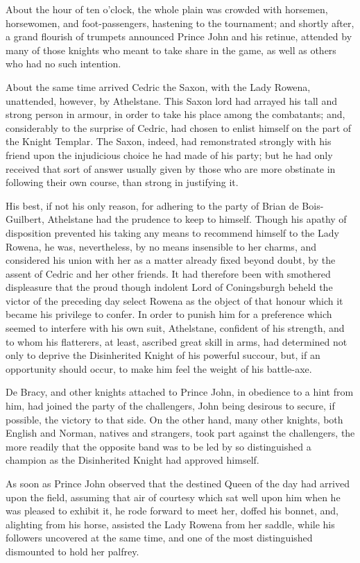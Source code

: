 About the hour of ten o'clock, the whole plain was crowded with
horsemen, horsewomen, and foot-passengers, hastening to the tournament;
and shortly after, a grand flourish of trumpets announced Prince John
and his retinue, attended by many of those knights who meant to take
share in the game, as well as others who had no such intention.

About the same time arrived Cedric the Saxon, with the Lady Rowena,
unattended, however, by Athelstane. This Saxon lord had arrayed his tall
and strong person in armour, in order to take his place among the
combatants; and, considerably to the surprise of Cedric, had chosen to
enlist himself on the part of the Knight Templar. The Saxon, indeed, had
remonstrated strongly with his friend upon the injudicious choice he had
made of his party; but he had only received that sort of answer usually
given by those who are more obstinate in following their own course,
than strong in justifying it.

His best, if not his only reason, for adhering to the party of Brian de
Bois-Guilbert, Athelstane had the prudence to keep to himself. Though
his apathy of disposition prevented his taking any means to recommend
himself to the Lady Rowena, he was, nevertheless, by no means insensible
to her charms, and considered his union with her as a matter already
fixed beyond doubt, by the assent of Cedric and her other friends. It
had therefore been with smothered displeasure that the proud though
indolent Lord of Coningsburgh beheld the victor of the preceding day
select Rowena as the object of that honour which it became his privilege
to confer. In order to punish him for a preference which seemed to
interfere with his own suit, Athelstane, confident of his strength, and
to whom his flatterers, at least, ascribed great skill in arms, had
determined not only to deprive the Disinherited Knight of his powerful
succour, but, if an opportunity should occur, to make him feel the
weight of his battle-axe.

De Bracy, and other knights attached to Prince John, in obedience to a
hint from him, had joined the party of the challengers, John being
desirous to secure, if possible, the victory to that side. On the other
hand, many other knights, both English and Norman, natives and
strangers, took part against the challengers, the more readily that the
opposite band was to be led by so distinguished a champion as the
Disinherited Knight had approved himself.

As soon as Prince John observed that the destined Queen of the day had
arrived upon the field, assuming that air of courtesy which sat well
upon him when he was pleased to exhibit it, he rode forward to meet her,
doffed his bonnet, and, alighting from his horse, assisted the Lady
Rowena from her saddle, while his followers uncovered at the same time,
and one of the most distinguished dismounted to hold her palfrey.

